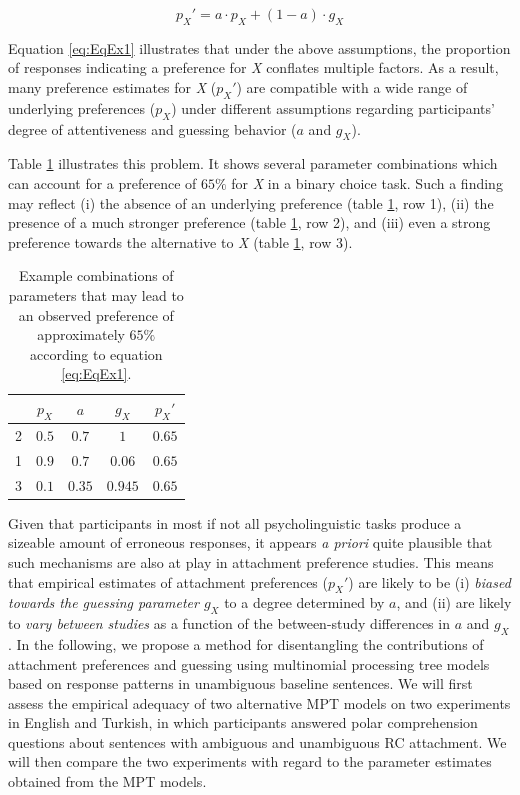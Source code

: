 \documentclass[11pt]{article}\usepackage[]{graphicx}\usepackage[]{color}
\begin{document}
\begin{equation}
p_{X}' = a \cdot p_{X} + (1-a) \cdot g_X
\label{eq:EqEx1}
\end{equation}

Equation \ref{eq:EqEx1} illustrates that under the above assumptions, the proportion of responses indicating a preference for \textit{X} conflates multiple factors. 
As a result, many preference estimates for \textit{X} ($p_{X}'$) are compatible with a wide range of underlying preferences ($p_{X}$) under different assumptions regarding participants' degree of attentiveness and guessing behavior ($a$ and $g_{X}$).

Table \ref{tab:param_comb} illustrates this problem. It shows several parameter combinations which can account for a preference of $65\%$ for \textit{X} in a binary choice task. Such a finding may reflect (i) the absence of an underlying preference (table \ref{tab:param_comb}, row 1), (ii) the presence of a much stronger preference (table \ref{tab:param_comb}, row 2), and (iii) even a strong preference towards the alternative to \textit{X} (table \ref{tab:param_comb}, row 3).

\begin{table}
\centering
\begin{tabular}{r|ccc|c}
  & $p_X$ & $a$ & $g_X$  & $p_X'$ \\
\hline
\hline
2  & $0.5$ & $0.7$  & $1$     & $0.65$ \\
1  & $0.9$ & $0.7$  & $0.06$  & $0.65$ \\
3  & $0.1$ & $0.35$ & $0.945$ & $0.65$ \\
\end{tabular}
\caption{Example combinations of parameters that may lead to an observed preference of approximately $65\%$ according to equation \ref{eq:EqEx1}. }
\label{tab:param_comb}
\end{table}


Given that participants in most if not all psycholinguistic tasks produce a sizeable amount of erroneous responses, it appears \textit{a priori} quite plausible that such mechanisms are also at play in attachment preference studies. This means that empirical estimates of attachment preferences ($p_X'$) are likely to be (i) \textit{biased towards the guessing parameter $g_X$} to a degree determined by $a$, and (ii) are likely to \textit{vary between studies} as a function of the between-study differences in $a$ and $g_X$.
In the following, we propose a method for disentangling the contributions of attachment preferences and guessing using multinomial processing tree models \citep[MPT;][]{ErdfelderEtAl:2009, BatchelderRiefer:1999} based on response patterns in unambiguous baseline sentences. We will first assess the empirical adequacy of two alternative MPT models on two experiments in English and Turkish, in which participants answered polar comprehension questions about sentences with ambiguous and unambiguous RC attachment. We will then compare the two experiments with regard to the parameter estimates obtained from the MPT models.
\end{document}
